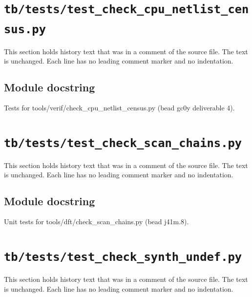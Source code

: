 \section{\texttt{tb/tests/test\_check\_cpu\_netlist\_census.py}}\label{cr:suite:test-check-cpu-netlist-census}

This section holds history text that was in a comment of the source file. The text is unchanged. Each line has no leading comment marker and no indentation.

\begin{record}

\subsection*{Module docstring}

\begin{textblock}
Tests for tools/verif/check_cpu_netlist_census.py (bead gc0y deliverable 4).
\end{textblock}

\end{record}

\section{\texttt{tb/tests/test\_check\_scan\_chains.py}}\label{cr:suite:test-check-scan-chains}

This section holds history text that was in a comment of the source file. The text is unchanged. Each line has no leading comment marker and no indentation.

\begin{record}

\subsection*{Module docstring}

\begin{textblock}
Unit tests for tools/dft/check_scan_chains.py (bead j41m.8).
\end{textblock}

\end{record}

\section{\texttt{tb/tests/test\_check\_synth\_undef.py}}\label{cr:suite:test-check-synth-undef}

This section holds history text that was in a comment of the source file. The text is unchanged. Each line has no leading comment marker and no indentation.

